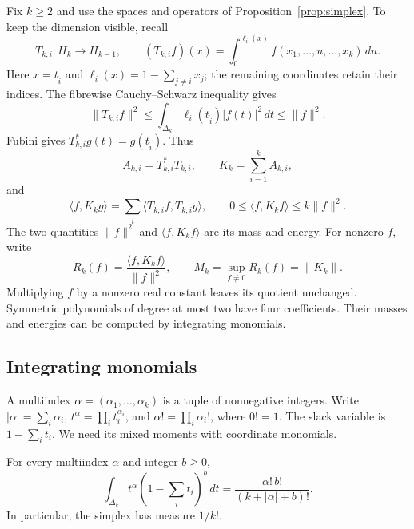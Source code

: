 \documentclass[11pt]{article}
\newcommand{\ip}[2]{\langle #1,#2\rangle}
\newcommand{\norm}[1]{\lVert #1\rVert}
\begin{document}
Fix $k\geq2$ and use the spaces and operators of
Proposition~\ref{prop:simplex}.  To keep the dimension visible, recall
\begin{equation}\label{var:eq:T}
 T_{k,i}:H_k\longrightarrow H_{k-1},\qquad
 (T_{k,i}f)(x)=\int_0^{\ell_i(x)}f(x_1,\ldots,u,\ldots,x_k)\,du.
\end{equation}
Here $x=t_{\widehat i}$ and $\ell_i(x)=1-\sum_{j\ne i}x_j$;
the remaining coordinates retain their indices.
The fibrewise Cauchy--Schwarz inequality gives
\begin{equation}\label{var:eq:bounded}
 \norm{T_{k,i}f}^2
 \leq\int_{\Delta_k}\ell_i(t_{\widehat i})|f(t)|^2\,dt
 \leq\norm f^2.
\end{equation}
Fubini gives $T_{k,i}^*g(t)=g(t_{\widehat i})$.  Thus
\begin{equation}\label{var:eq:K}
 A_{k,i}=T_{k,i}^*T_{k,i},\qquad K_k=\sum_{i=1}^kA_{k,i},
\end{equation}
and
\begin{equation}\label{var:eq:energy}
 \ip f{K_kg}=\sum_i\ip{T_{k,i}f}{T_{k,i}g},\qquad
 0\leq\ip f{K_kf}\leq k\norm f^2.
\end{equation}
The two quantities $\norm f^2$ and $\ip f{K_kf}$ are its mass and energy.
For nonzero $f$, write
\begin{equation}\label{var:eq:variational}
 R_k(f)=\frac{\ip f{K_kf}}{\norm f^2},\qquad
 M_k=\sup_{f\ne0}R_k(f)=\norm{K_k}.
\end{equation}
Multiplying $f$ by a nonzero real constant leaves its quotient unchanged.
Symmetric polynomials of degree at most two have four coefficients.
Their masses and energies can be computed by integrating monomials.

\subsection{Integrating monomials}

A multiindex $\alpha=(\alpha_1,\ldots,\alpha_k)$ is a tuple of
nonnegative integers.  Write
$|\alpha|=\sum_i\alpha_i$, $t^\alpha=\prod_i t_i^{\alpha_i}$, and
$\alpha!=\prod_i\alpha_i!$, where $0!=1$.
The slack variable is $1-\sum_i t_i$.
We need its mixed moments with coordinate monomials.

\begin{lemma}
For\label{var:lem:moment} every multiindex $\alpha$ and integer $b\geq0$,
\begin{equation}\label{var:eq:moment}
 \int_{\Delta_k}t^\alpha\left(1-\sum_i t_i\right)^b\,dt
       =\frac{\alpha!\,b!}{(k+|\alpha|+b)!}.
\end{equation}
In particular, the simplex has measure $1/k!$.
\end{lemma}
\end{document}
